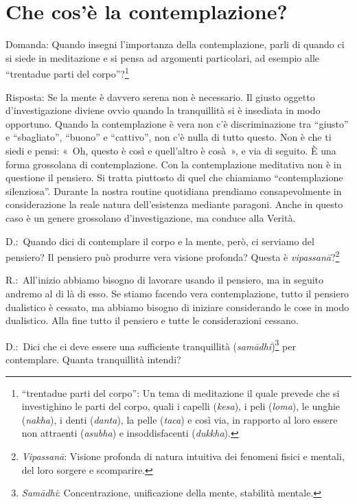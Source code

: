 \chapter{Che cos'è la contemplazione?}

Domanda: Quando insegni l'importanza della contemplazione, parli di
quando ci si siede in meditazione e si pensa ad argomenti particolari,
ad esempio alle ``trentadue parti del
corpo''?\footnote{``trentadue parti del corpo'': Un
  tema di meditazione il quale prevede che si investighino le parti del
  corpo, quali i capelli (\emph{kesa}), i peli (\emph{loma}), le unghie
  (\emph{nakha}), i denti (\emph{danta}), la pelle (\emph{taca}) e così
  via, in rapporto al loro essere non attraenti (\emph{asubha}) e
  insoddisfacenti (\emph{dukkha}).}

Risposta: Se la mente è davvero serena non è necessario. Il giusto
oggetto d'investigazione diviene ovvio quando la tranquillità si è
insediata in modo opportuno. Quando la contemplazione è vera non c'è
discriminazione tra ``giusto'' e ``sbagliato'', ``buono'' e ``cattivo'',
non c'è nulla di tutto questo. Non è che ti siedi e pensi: «~Oh, questo
è così e quell'altro è cosà~», e via di seguito. È una forma grossolana
di contemplazione. Con la contemplazione meditativa non è in questione
il pensiero. Si tratta piuttosto di quel che chiamiamo ``contemplazione
silenziosa''. Durante la nostra routine quotidiana prendiamo
consapevolmente in considerazione la reale natura dell'esistenza
mediante paragoni. Anche in questo caso è un genere grossolano
d'investigazione, ma conduce alla Verità.

D.:~Quando dici di contemplare il corpo e la mente, però, ci serviamo
del pensiero? Il pensiero può produrre vera visione profonda? Questa è
\emph{vipassanā}?\footnote{\emph{Vipassanā}: Visione
  profonda di natura intuitiva dei fenomeni fisici e mentali, del loro
  sorgere e scomparire.}

R.:~All'inizio abbiamo bisogno di lavorare usando il pensiero, ma in
seguito andremo al di là di esso. Se stiamo facendo vera contemplazione,
tutto il pensiero dualistico è cessato, ma abbiamo bisogno di iniziare
considerando le cose in modo dualistico. Alla fine tutto il pensiero e
tutte le considerazioni cessano.

D.:~Dici che ci deve essere una sufficiente tranquillità
(\emph{samādhi})\footnote{\emph{Samādhi}:
  Concentrazione, unificazione della mente, stabilità mentale.} per
contemplare. Quanta tranquillità intendi?


